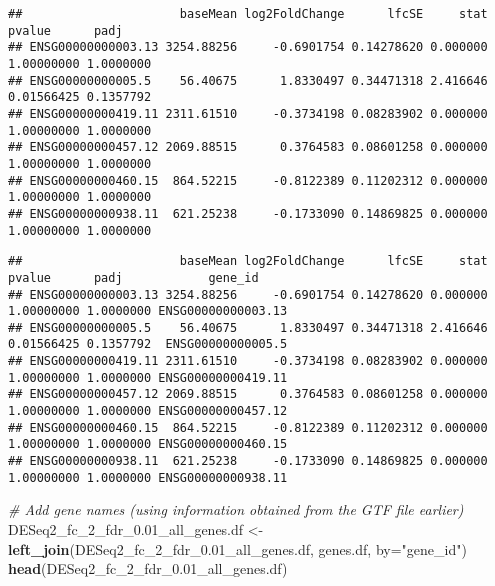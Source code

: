 \documentclass[]{book}
\newenvironment{Shaded}{\begin{snugshade}}{\end{snugshade}}
\newcommand{\KeywordTok}[1]{\textcolor[rgb]{0.13,0.29,0.53}{\textbf{#1}}}
\newcommand{\DataTypeTok}[1]{\textcolor[rgb]{0.13,0.29,0.53}{#1}}
\newcommand{\FloatTok}[1]{\textcolor[rgb]{0.00,0.00,0.81}{#1}}
\newcommand{\StringTok}[1]{\textcolor[rgb]{0.31,0.60,0.02}{#1}}
\newcommand{\CommentTok}[1]{\textcolor[rgb]{0.56,0.35,0.01}{\textit{#1}}}
\newcommand{\OperatorTok}[1]{\textcolor[rgb]{0.81,0.36,0.00}{\textbf{#1}}}
\newcommand{\NormalTok}[1]{#1}
\begin{document}
\begin{verbatim}
##                      baseMean log2FoldChange      lfcSE     stat     pvalue      padj
## ENSG00000000003.13 3254.88256     -0.6901754 0.14278620 0.000000 1.00000000 1.0000000
## ENSG00000000005.5    56.40675      1.8330497 0.34471318 2.416646 0.01566425 0.1357792
## ENSG00000000419.11 2311.61510     -0.3734198 0.08283902 0.000000 1.00000000 1.0000000
## ENSG00000000457.12 2069.88515      0.3764583 0.08601258 0.000000 1.00000000 1.0000000
## ENSG00000000460.15  864.52215     -0.8122389 0.11202312 0.000000 1.00000000 1.0000000
## ENSG00000000938.11  621.25238     -0.1733090 0.14869825 0.000000 1.00000000 1.0000000
\end{verbatim}

\begin{Shaded}
\end{Shaded}

\begin{verbatim}
##                      baseMean log2FoldChange      lfcSE     stat     pvalue      padj            gene_id
## ENSG00000000003.13 3254.88256     -0.6901754 0.14278620 0.000000 1.00000000 1.0000000 ENSG00000000003.13
## ENSG00000000005.5    56.40675      1.8330497 0.34471318 2.416646 0.01566425 0.1357792  ENSG00000000005.5
## ENSG00000000419.11 2311.61510     -0.3734198 0.08283902 0.000000 1.00000000 1.0000000 ENSG00000000419.11
## ENSG00000000457.12 2069.88515      0.3764583 0.08601258 0.000000 1.00000000 1.0000000 ENSG00000000457.12
## ENSG00000000460.15  864.52215     -0.8122389 0.11202312 0.000000 1.00000000 1.0000000 ENSG00000000460.15
## ENSG00000000938.11  621.25238     -0.1733090 0.14869825 0.000000 1.00000000 1.0000000 ENSG00000000938.11
\end{verbatim}

\begin{Shaded}
\begin{Highlighting}[]
\CommentTok{# Add gene names (using information obtained from the GTF file earlier)}
\NormalTok{DESeq2_fc_2_fdr_}\FloatTok{0.}\NormalTok{01_all_genes.df <-}\KeywordTok{left_join}\NormalTok{(DESeq2_fc_2_fdr_}\FloatTok{0.}\NormalTok{01_all_genes.df, genes.df, }\DataTypeTok{by=}\StringTok{"gene_id"}\NormalTok{)}
\KeywordTok{head}\NormalTok{(DESeq2_fc_2_fdr_}\FloatTok{0.}\NormalTok{01_all_genes.df)}
\end{Highlighting}
\end{Shaded}
\end{document}
